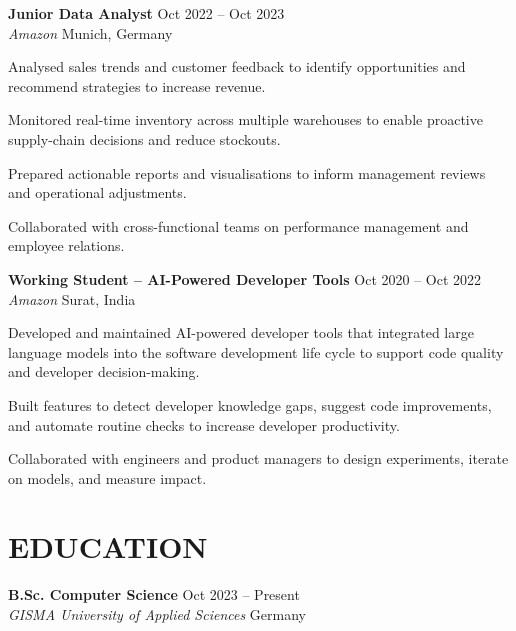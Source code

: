 \documentclass[10pt, letterpaper]{article}
\begin{document}
\vspace{6pt}
\textbf{Junior Data Analyst} \hfill Oct 2022 -- Oct 2023 \\
\textit{Amazon} \hfill Munich, Germany
\begin{cvitems}
    \item Analysed sales trends and customer feedback to identify opportunities and recommend strategies to increase revenue.
    \item Monitored real-time inventory across multiple warehouses to enable proactive supply-chain decisions and reduce stockouts.
    \item Prepared actionable reports and visualisations to inform management reviews and operational adjustments.
    \item Collaborated with cross-functional teams on performance management and employee relations.
\end{cvitems}

\vspace{6pt}
\textbf{Working Student -- AI-Powered Developer Tools} \hfill Oct 2020 -- Oct 2022 \\
\textit{Amazon} \hfill Surat, India
\begin{cvitems}
    \item Developed and maintained AI-powered developer tools that integrated large language models into the software development life cycle to support code quality and developer decision-making.
    \item Built features to detect developer knowledge gaps, suggest code improvements, and automate routine checks to increase developer productivity.
    \item Collaborated with engineers and product managers to design experiments, iterate on models, and measure impact.
\end{cvitems}

\section*{EDUCATION}

\vspace{4pt}
\textbf{B.Sc. Computer Science} \hfill Oct 2023 -- Present \\
\textit{GISMA University of Applied Sciences} \hfill Germany

\end{document}
